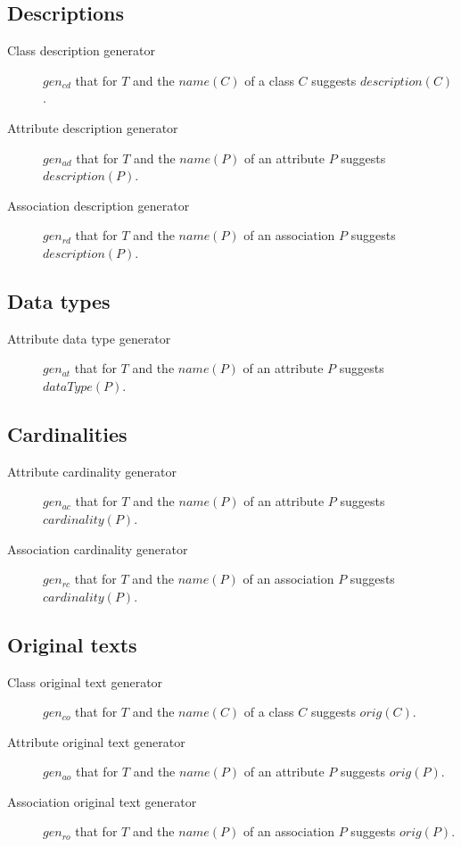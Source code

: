 \subsection{Descriptions}

\begin{description}
\item [Class description generator] $gen_{cd}$ that for $T$ and the $name(C)$ of a class $C$ suggests $description(C)$.

\item [Attribute description generator] $gen_{ad}$ that for $T$ and the $name(P)$ of an attribute $P$ suggests $description(P)$.

\item [Association description generator] $gen_{rd}$ that for $T$ and the $name(P)$ of an association $P$ suggests $description(P)$.
\end{description}


\subsection{Data types}

\begin{description}
\item [Attribute data type generator] $gen_{at}$ that for $T$ and the $name(P)$ of an attribute $P$ suggests $dataType(P)$.
\end{description}


\subsection{Cardinalities}

\begin{description}
\item [Attribute cardinality generator] $gen_{ac}$ that for $T$ and the $name(P)$ of an attribute $P$ suggests $cardinality(P)$.

\item [Association cardinality generator] $gen_{rc}$ that for $T$ and the $name(P)$ of an association $P$ suggests $cardinality(P)$.
\end{description}


\subsection{Original texts}

\begin{description}
\item [Class original text generator] $gen_{co}$ that for $T$ and the $name(C)$ of a class $C$ suggests $orig(C)$.

\item [Attribute original text generator] $gen_{ao}$ that for $T$ and the $name(P)$ of an attribute $P$ suggests $orig(P)$.

\item [Association original text generator] $gen_{ro}$ that for $T$ and the $name(P)$ of an association $P$ suggests $orig(P)$.
\end{description}


